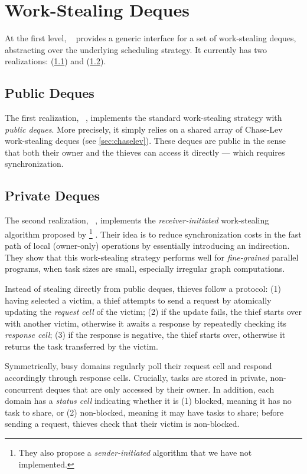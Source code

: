 \section{Work-Stealing Deques}

At the first level, ~ provides a generic interface for a set of work-stealing deques, abstracting over the underlying scheduling strategy.
It currently has two realizations:  (\cref{sec:parabs_ws_deques_public}) and  (\cref{sec:parabs_ws_deques_private}).

\subsection{Public Deques}
\label{sec:parabs_ws_deques_public}

The first realization, ~, implements the standard work-stealing strategy with \emph{public deques}.
More precisely, it simply relies on a shared array of Chase-Lev work-stealing deques (see \cref{sec:chaselev}).
These deques are public in the sense that both their owner and the thieves can access it directly --- which requires synchronization.

\subsection{Private Deques}
\label{sec:parabs_ws_deques_private}

The second realization, ~, implements the \emph{receiver-initiated} work-stealing algorithm proposed by \citet{DBLP:conf/ppopp/AcarCR13}%
\footnote{
They also propose a \emph{sender-initiated} algorithm that we have not implemented.
}%
.
Their idea is to reduce synchronization costs in the fast path of local (owner-only) operations by essentially introducing an indirection.
They show that this work-stealing strategy performs well for \emph{fine-grained} parallel programs, \ie when task sizes are small, especially irregular graph computations.

Instead of stealing directly from public deques, thieves follow a protocol:
(1) having selected a victim, a thief attempts to send a request by atomically updating the \emph{request cell} of the victim;
(2) if the update fails, the thief starts over with another victim, otherwise it awaits a response by repeatedly checking its \emph{response cell};
(3) if the response is negative, the thief starts over, otherwise it returns the task transferred by the victim.

Symmetrically, busy domains regularly poll their request cell and respond accordingly through response cells.
Crucially, tasks are stored in private, non-concurrent deques that are only accessed by their owner.
In addition, each domain has a \emph{status cell} indicating whether it is (1) blocked, meaning it has no task to share, or (2) non-blocked, meaning it may have tasks to share; before sending a request, thieves check that their victim is non-blocked.
